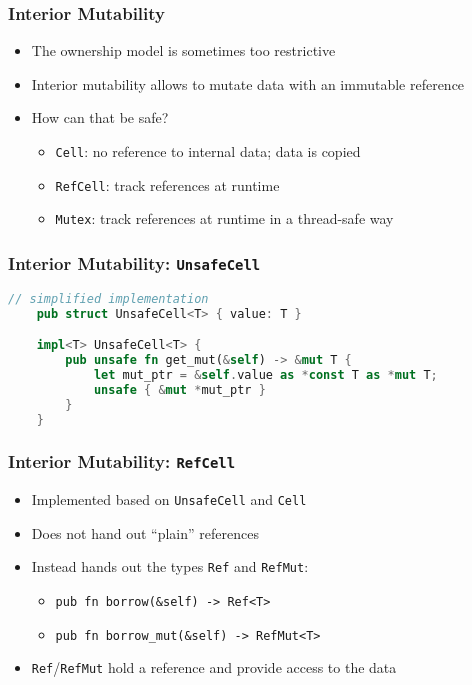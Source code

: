 \begin{frame}[fragile]
    \frametitle{Interior Mutability}

    \begin{itemize}
        \item The ownership model is sometimes too restrictive
        \item Interior mutability allows to mutate data with an immutable reference
        \pause
        \item How can that be safe?
        \begin{itemize}
            \item \texttt{Cell}: no reference to internal data; data is copied
            \item \texttt{RefCell}: track references at runtime
            \item \texttt{Mutex}: track references at runtime in a thread-safe way
        \end{itemize}
    \end{itemize}
\end{frame}

\begin{frame}[fragile]
    \frametitle{Interior Mutability: \texttt{UnsafeCell}}

    \begin{lstlisting}[language=rust]
    // simplified implementation
    pub struct UnsafeCell<T> { value: T }

    impl<T> UnsafeCell<T> {
        pub unsafe fn get_mut(&self) -> &mut T {
            let mut_ptr = &self.value as *const T as *mut T;
            unsafe { &mut *mut_ptr }
        }
    }
    \end{lstlisting}
\end{frame}

\begin{frame}[fragile]
    \frametitle{Interior Mutability: \texttt{RefCell}}

    \begin{itemize}
        \item Implemented based on \texttt{UnsafeCell} and \texttt{Cell}
        \item Does not hand out ``plain'' references
        \item Instead hands out the types \texttt{Ref} and \texttt{RefMut}:
        \begin{itemize}
            \item \texttt{pub fn borrow(\&self) -> Ref<T>}
            \item \texttt{pub fn borrow\_mut(\&self) -> RefMut<T>}
        \end{itemize}
        \item \texttt{Ref}/\texttt{RefMut} hold a reference and provide access to the data
    \end{itemize}
\end{frame}

